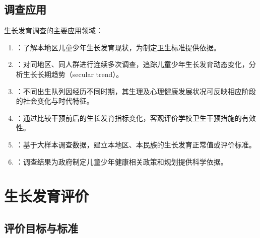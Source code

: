 \subsection{调查应用}

\begin{defbox}
生长发育调查的主要应用领域：

\begin{enumerate}[leftmargin=*]
    \item {}：了解本地区儿童少年生长发育现状，为制定卫生标准提供依据。
    \item {}：对同地区、同人群进行连续多次调查，追踪儿童少年生长发育动态变化，分析生长长期趋势（secular trend）。
    \item {}：不同出生队列因经历不同时期，其生理及心理健康发展状况可反映相应阶段的社会变化与时代特征。
    \item {}：通过比较干预前后的生长发育指标变化，客观评价学校卫生干预措施的有效性。
    \item {}：基于大样本调查数据，建立本地区、本民族的生长发育正常值或评价标准。
    \item {}：调查结果为政府制定儿童少年健康相关政策和规划提供科学依据。
\end{enumerate}
\end{defbox}

\section{生长发育评价}

\subsection{评价目标与标准}

